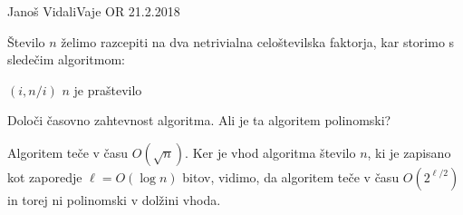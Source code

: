\begin{naloga}{Janoš Vidali}{Vaje OR 21.2.2018}
\begin{vprasanje}
Število $n$ želimo razcepiti
na dva netrivialna celoštevilska faktorja,
kar storimo s sledečim algoritmom:
\begin{small}
\begin{algorithmic}
            \State \Return $(i, n/i)$
        \EndIf
    \EndFor
    \State \Return $n$ je praštevilo
\EndFunction
\end{algorithmic}
\end{small}
Določi časovno zahtevnost algoritma.
Ali je ta algoritem polinomski?
\end{vprasanje}

\begin{odgovor}
Algoritem teče v času $O(\sqrt{n})$.
Ker je vhod algoritma število $n$,
ki je zapisano kot zaporedje $\ell = O(\log n)$ bitov,
vidimo, da algoritem teče v času $O(2^{\ell/2})$
in torej ni polinomski v dolžini vhoda.
\end{odgovor}
\end{naloga}
